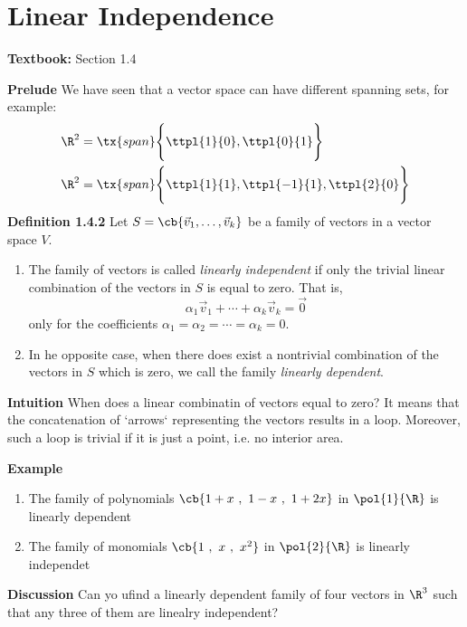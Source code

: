 \documentclass[letterpaper, 10pt]{article}
\begin{document}
\newpage
\section*{Linear Independence}%
\label{sec:Linear Independence}

\textbf{Textbook:} Section 1.4

\lb
\textbf{Prelude}
\lb
We have seen that a vector space can have different spanning sets, for example:
\begin{align*}
    \R^2 &= \tx{span} \Bigg \{ \ttpl{1}{0}, \ttpl{0}{1} \Bigg \} \\
    \R^2 &= \tx{span} \Bigg \{ \ttpl{1}{1}, \ttpl{-1}{1}, \ttpl{2}{0} \Bigg \}
\end{align*}
\lb
\lb
\lb
\lb
\lb
\lb
\lb
\textbf{Definition 1.4.2}
\lb
Let $S = \cb{\vec v_1, \ldots, \vec v_k} $ be a family of vectors in a vector space $V$.
\begin{enumerate}
    \item 
        The family of vectors is called \emph{linearly independent} if only the
        trivial linear combination of the vectors in $S$ is equal to zero.
        \pr
        That is,
        \[ α_1 \vec v_1 + \cdots + α_k \vec v_k = \vec 0 \]
        only for the coefficients $α_1 = α_2 = \cdots = α_k = 0$.
    \item
        In he opposite case, when there does exist a nontrivial combination of the vectors in $S$
        which is zero, we call the family \emph{linearly dependent}.
\end{enumerate}


\lb
\textbf{Intuition}
\lb
When does a linear combinatin of vectors equal to zero? It means that the concatenation of
`arrows` representing the vectors results in a loop.
\lb
Moreover, such a loop is trivial if it is just a point, i.e. no interior area.



\newpage

\lb
\textbf{Example}
\lb
\begin{enumerate}
    \item The family of polynomials $ \cb{1+x ~,~ 1-x ~,~ 1+2x}$ in $\pol{1}{\R}$ is linearly
        dependent
    \item The family of monomials $ \cb{1 ~,~ x ~,~ x^2}$ in $\pol{2}{\R}$ is linearly
        independet
\end{enumerate}


\lb
\textbf{Discussion}
\lb
Can yo ufind a linearly dependent family of four vectors in $\R^3$
such that any three of them are linealry independent?
\end{document}
